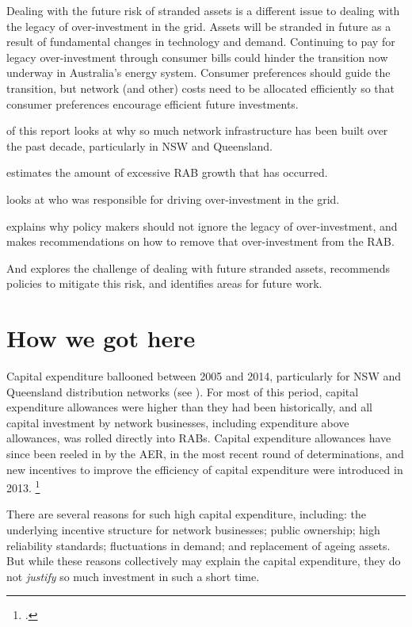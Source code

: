 \documentclass[FrontPage]{grattan}
\begin{document}
Dealing with the future risk of stranded assets is a different issue to dealing with the legacy of over-investment in the grid. Assets will be stranded in future as a result of fundamental changes in technology and demand. Continuing to pay for legacy over-investment through consumer bills could hinder the transition now underway in Australia's energy system. Consumer preferences should guide the transition, but network (and other) costs need to be allocated efficiently so that consumer preferences encourage efficient future investments.

 of this report looks at why so much network infrastructure has been built over the past decade, particularly in NSW and Queensland.

 estimates the amount of excessive RAB growth that has occurred.

 looks at who was responsible for driving over-investment in the grid. 

 explains why policy makers should not ignore the legacy of over-investment, and makes recommendations on how to remove that over-investment from the RAB\@.

And  explores the challenge of dealing with future stranded assets, recommends policies to mitigate this risk, and identifies areas for future work.



\chapter{How we got here}\label{chap:history-how-we-got-here}

Capital expenditure ballooned between 2005 and 2014, particularly for NSW and Queensland distribution networks (see ). For most of this period, capital expenditure allowances were higher than they had been historically, and all capital investment by network businesses, including expenditure above allowances, was rolled directly into RABs. Capital expenditure allowances have since been reeled in by the AER, in the most recent round of determinations, and new incentives to improve the efficiency of capital expenditure were introduced in 2013.%
\footcite{AER2013capexincentives}

There are several reasons for such high capital expenditure, including: the underlying incentive structure for network businesses; public ownership; high reliability standards; fluctuations in demand; and replacement of ageing assets. But while these reasons collectively may explain the capital expenditure, they do not \emph{justify} so much investment in such a short time. 
\end{document}
